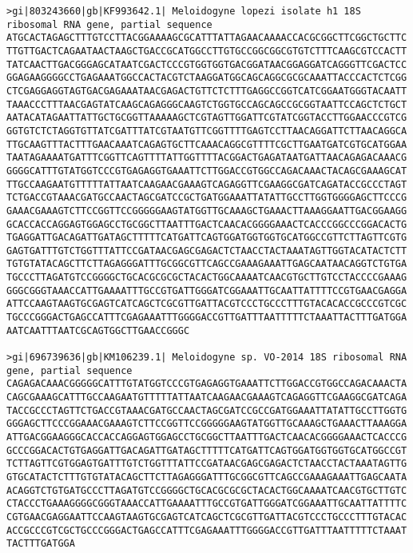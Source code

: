 \documentclass[11pt]{article}
\begin{document}
\begin{Verbatim}[commandchars=\\\{\}]
>gi|803243660|gb|KF993642.1| Meloidogyne lopezi isolate h1 18S ribosomal RNA gene, partial sequence
ATGCACTAGAGCTTTGTCCTTACGGAAAAGCGCATTTATTAGAACAAAACCACGCGGCTTCGGCTGCTTC
TTGTTGACTCAGAATAACTAAGCTGACCGCATGGCCTTGTGCCGGCGGCGTGTCTTTCAAGCGTCCACTT
TATCAACTTGACGGGAGCATAATCGACTCCCGTGGTGGTGACGGATAACGGAGGATCAGGGTTCGACTCC
GGAGAAGGGGCCTGAGAAATGGCCACTACGTCTAAGGATGGCAGCAGGCGCGCAAATTACCCACTCTCGG
CTCGAGGAGGTAGTGACGAGAAATAACGAGACTGTTCTCTTTGAGGCCGGTCATCGGAATGGGTACAATT
TAAACCCTTTAACGAGTATCAAGCAGAGGGCAAGTCTGGTGCCAGCAGCCGCGGTAATTCCAGCTCTGCT
AATACATAGAATTATTGCTGCGGTTAAAAAGCTCGTAGTTGGATTCGTATCGGTACCTTGGAACCCGTCG
GGTGTCTCTAGGTGTTATCGATTTATCGTAATGTTCGGTTTTGAGTCCTTAACAGGATTCTTAACAGGCA
TTGCAAGTTTACTTTGAACAAATCAGAGTGCTTCAAACAGGCGTTTTCGCTTGAATGATCGTGCATGGAA
TAATAGAAAATGATTTCGGTTCAGTTTTATTGGTTTTACGGACTGAGATAATGATTAACAGAGACAAACG
GGGGCATTTGTATGGTCCCGTGAGAGGTGAAATTCTTGGACCGTGGCCAGACAAACTACAGCGAAAGCAT
TTGCCAAGAATGTTTTTATTAATCAAGAACGAAAGTCAGAGGTTCGAAGGCGATCAGATACCGCCCTAGT
TCTGACCGTAAACGATGCCAACTAGCGATCCGCTGATGGAAATTATATTGCCTTGGTGGGGAGCTTCCCG
GAAACGAAAGTCTTCCGGTTCCGGGGGAAGTATGGTTGCAAAGCTGAAACTTAAAGGAATTGACGGAAGG
GCACCACCAGGAGTGGAGCCTGCGGCTTAATTTGACTCAACACGGGGAAACTCACCCGGCCCGGACACTG
TGAGGATTGACAGATTGATAGCTTTTTCATGATTCAGTGGATGGTGGTGCATGGCCGTTCTTAGTTCGTG
GAGTGATTTGTCTGGTTTATTCCGATAACGAGCGAGACTCTAACCTACTAAATAGTTGGTACATACTCTT
TGTGTATACAGCTTCTTAGAGGGATTTGCGGCGTTCAGCCGAAAGAAATTGAGCAATAACAGGTCTGTGA
TGCCCTTAGATGTCCGGGGCTGCACGCGCGCTACACTGGCAAAATCAACGTGCTTGTCCTACCCCGAAAG
GGGCGGGTAAACCATTGAAAATTTGCCGTGATTGGGATCGGAAATTGCAATTATTTTCCGTGAACGAGGA
ATTCCAAGTAAGTGCGAGTCATCAGCTCGCGTTGATTACGTCCCTGCCCTTTGTACACACCGCCCGTCGC
TGCCCGGGACTGAGCCATTTCGAGAAATTTGGGGACCGTTGATTTAATTTTTCTAAATTACTTTGATGGA
AATCAATTTAATCGCAGTGGCTTGAACCGGGC

>gi|696739636|gb|KM106239.1| Meloidogyne sp. VO-2014 18S ribosomal RNA gene, partial sequence
CAGAGACAAACGGGGGCATTTGTATGGTCCCGTGAGAGGTGAAATTCTTGGACCGTGGCCAGACAAACTA
CAGCGAAAGCATTTGCCAAGAATGTTTTTATTAATCAAGAACGAAAGTCAGAGGTTCGAAGGCGATCAGA
TACCGCCCTAGTTCTGACCGTAAACGATGCCAACTAGCGATCCGCCGATGGAAATTATATTGCCTTGGTG
GGGAGCTTCCCGGAAACGAAAGTCTTCCGGTTCCGGGGGAAGTATGGTTGCAAAGCTGAAACTTAAAGGA
ATTGACGGAAGGGCACCACCAGGAGTGGAGCCTGCGGCTTAATTTGACTCAACACGGGGAAACTCACCCG
GCCCGGACACTGTGAGGATTGACAGATTGATAGCTTTTTCATGATTCAGTGGATGGTGGTGCATGGCCGT
TCTTAGTTCGTGGAGTGATTTGTCTGGTTTATTCCGATAACGAGCGAGACTCTAACCTACTAAATAGTTG
GTGCATACTCTTTGTGTATACAGCTTCTTAGAGGGATTTGCGGCGTTCAGCCGAAAGAAATTGAGCAATA
ACAGGTCTGTGATGCCCTTAGATGTCCGGGGCTGCACGCGCGCTACACTGGCAAAATCAACGTGCTTGTC
CTACCCTGAAAGGGGCGGGTAAACCATTGAAAATTTGCCGTGATTGGGATCGGAAATTGCAATTATTTTC
CGTGAACGAGGAATTCCAAGTAAGTGCGAGTCATCAGCTCGCGTTGATTACGTCCCTGCCCTTTGTACAC
ACCGCCCGTCGCTGCCCGGGACTGAGCCATTTCGAGAAATTTGGGGACCGTTGATTTAATTTTTCTAAAT
TACTTTGATGGA


\end{Verbatim}
\end{document}
